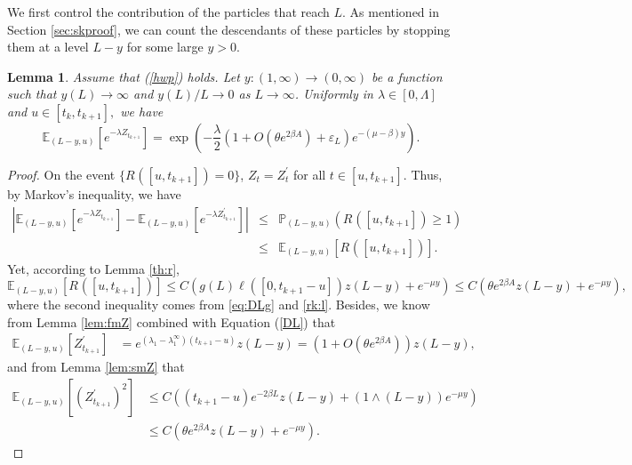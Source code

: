 \documentclass[11pt]{article}
\theoremstyle{plain}
\newtheorem{lemma}{Lemma}[section]
\newcommand\linf{\lambda_1^\infty}
\newcommand\vep{\varepsilon}
\begin{document}
We first control the contribution of the particles that reach $L$. As mentioned in Section \ref{sec:skproof}, we can count the descendants of these particles by stopping them at a  level $L-y$ for some large $y>0$.
\begin{lemma}\label{lem:71}Assume that (\ref{hwp}) holds. Let $y:(1,\infty)\rightarrow (0,\infty)$ be a function such that $y(L)\rightarrow\infty$ and $y(L)/L\to0$ as $L\to \infty$. Uniformly in $\lambda\in[0,\Lambda]$ and $u\in[t_k,t_{k+1}],$ we have
\begin{equation*}
\mathbb{E}_{(L-y,u)}
\left[e^{-\lambda Z^{}_{t_{k+1}}}\right]= \exp\left(-\frac{\lambda}{2}(1+O(\theta e^{2\beta A})+\vep_L)e^{-(\mu-\beta)y}\right).
\end{equation*}
\end{lemma}
\begin{proof}
On the event $\{R^{}([u,t_{k+1}])=0\}$, $Z^{}_t=Z_t^{'}$ for all $t\in[u,t_{k+1}]$. Thus, by Markov's inequality, we have
\begin{eqnarray}
\left|\mathbb{E}_{(L-y,u)}\left[e^{-\lambda Z^{}_{t_{k+1}}}\right]-\mathbb{E}_{(L-y,u)}\left[e^{-\lambda Z^{'}_{t_{k+1}}}\right]\right|&\leqslant& \mathbb{P}_{(L-y,u)}\left(R^{}([u,t_{k+1}])\geqslant 1\right)\nonumber\\
&\leqslant& \mathbb{E}_{(L-y,u)}\left[R^{}([u,t_{k+1}])\right]\label{eq:mkRA}.
\end{eqnarray}
Yet, according to Lemma \ref{th:r}, 
\begin{equation}
\mathbb{E}_{(L-y,u)}\left[R^{}([u,t_{k+1}])\right]\leqslant C\left(g(L)\ell\left([0,t_{k+1}-u]\right)z(L-y)+e^{-\mu y}\right)\leqslant C(\theta e^{2\beta A}z(L-y)+e^{-\mu y}),
\label{eq:expR}
\end{equation}
where the second inequality comes from \eqref{eq:DLg} and  \eqref{rk:l}.
Besides, we know from Lemma \ref{lem:fmZ} combined with Equation (\ref{DL}) that
\begin{align}
\mathbb{E}_{(L-y,u)}\left[Z^{'}_{t_{k+1}}\right]&=e^{(\lambda_1-\linf)(t_{k+1}-u)}z(L-y)=(1+O(\theta e^{2\beta A}))z(L-y),\label{eq:expZ}
\end{align}
and from Lemma \ref{lem:smZ} that
\begin{align}
\mathbb{E}_{(L-y,u)}\left[(Z^{'}_{t_{k+1}})^2\right]&\leqslant C((t_{k+1}-u)e^{-2\beta L}z(L-y)+(1\wedge (L-y))e^{-\mu y})\nonumber\\
&\leqslant C(\theta e^{2\beta A} z(L-y)+e^{-\mu y})\label{eq:varZ}.
\end{align}

\end{proof}
\end{document}
